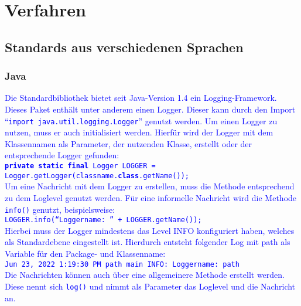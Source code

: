 \chapter{Verfahren}\label{ch:verfahren}


\section{Standards aus verschiedenen Sprachen}\label{sec:standards-aus-verschiedenen-sprachen}

\subsection{Java}\label{subsec:java}
\textcolor{blue}{
    Die Standardbibliothek bietet seit Java-Version 1.4 ein Logging-Framework.
    Dieses Paket enthält unter anderem einen Logger.
    Dieser kann durch den Import \enquote{\texttt{import java.util.logging.Logger}} genutzt werden.
    Um einen Logger zu nutzen, muss er auch initialisiert werden.
    Hierfür wird der Logger mit dem Klassennamen als Parameter, der nutzenden Klasse, erstellt oder der entsprechende Logger gefunden:
    \\
    \hspace*{10mm}
    \texttt{\textbf{private static final} Logger LOGGER =
        \\
        \hspace*{30mm}Logger.getLogger(classname.\textbf{class}.getName());}
    \\
    Um eine Nachricht mit dem Logger zu erstellen, muss die Methode entsprechend zu dem Loglevel genutzt werden.
    Für eine informelle Nachricht wird die Methode \texttt{info()} genutzt, beispielsweise:
    \\
    \hspace*{10mm}
    \texttt{LOGGER.info(\enquote{Loggername: } + LOGGER.getName());}
    \\
    Hierbei muss der Logger mindestens das Level INFO konfiguriert haben, welches als Standardebene eingestellt ist.
    Hierdurch entsteht folgender Log mit path als Variable für den Package- und Klassenname:
    \\
    \hspace*{10mm}
    \texttt{Jun 23, 2022 1:19:30 PM path main INFO: Loggername: path}
    \\
    Die Nachrichten können auch über eine allgemeinere Methode erstellt werden.
    Diese nennt sich \texttt{log()} und nimmt als Parameter das Loglevel und die Nachricht an.
}
